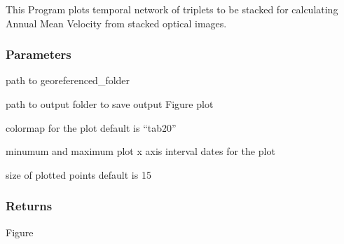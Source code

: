 \documentclass[letterpaper,10pt]{sphinxmanual}
\begin{document}
\begin{fulllineitems}
\label{\detokenize{generated/akhdefo_functions.plot_stackNetwork:akhdefo_functions.plot_stackNetwork}}
\pysigstartsignatures
{}
\pysigstopsignatures
\sphinxAtStartPar
This Program plots temporal network of triplets to be stacked for calculating 
Annual Mean Velocity from stacked optical images.


\subsubsection{Parameters}
\label{\detokenize{generated/akhdefo_functions.plot_stackNetwork:parameters}}\begin{description}
\sphinxAtStartPar
path to georeferenced\_folder

\sphinxAtStartPar
path to output folder to save output Figure plot

\sphinxAtStartPar
colormap for the plot default is “tab20”

\sphinxAtStartPar
minumum and maximum plot x axis interval dates for the plot

\sphinxAtStartPar
size of plotted points default is 15

\end{description}


\subsubsection{Returns}
\label{\detokenize{generated/akhdefo_functions.plot_stackNetwork:returns}}
\sphinxAtStartPar
Figure

\end{fulllineitems}


\sphinxstepscope
\end{document}
